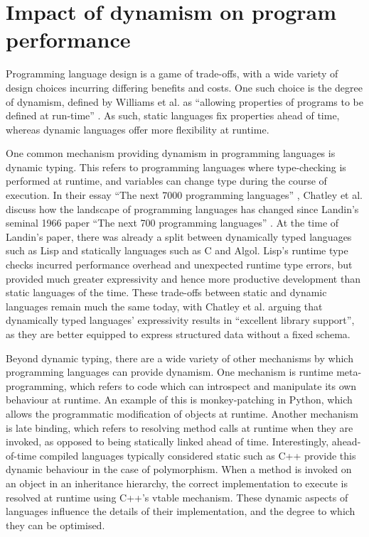 \section{Impact of dynamism on program performance}
\label{sec:impact-dynamism-related-work}

Programming language design is a game of trade-offs, with a wide variety of design choices incurring differing benefits and costs.
One such choice is the degree of dynamism, defined by Williams et al. as ``allowing properties of programs to be defined at run-time'' \cite{williamsDynamicInterpretationDynamic2010}. As such, static languages fix properties ahead of time, whereas dynamic languages offer more flexibility at runtime.

One common mechanism providing dynamism in programming languages is dynamic typing. This refers to programming languages where type-checking is performed at runtime, and variables can change type during the course of execution.
In their essay ``The next 7000 programming languages'' \cite{chatleyNext7000Programming2019}, Chatley et al. discuss how the landscape of programming languages has changed since Landin's seminal 1966 paper ``The next 700 programming languages'' \cite{landinNext700Programming1966}. At the time of Landin's paper, there was already a split between dynamically typed languages such as Lisp and statically languages such as C and Algol. Lisp's runtime type checks incurred performance overhead and unexpected runtime type errors, but provided much greater expressivity and hence more productive development than static languages of the time. These trade-offs between static and dynamic languages remain much the same today, with Chatley et al. arguing that dynamically typed languages' expressivity results in ``excellent library support'', as they are better equipped to express structured data without a fixed schema.

Beyond dynamic typing, there are a wide variety of other mechanisms by which programming languages can provide dynamism.
One mechanism is runtime meta-programming, which refers to code which can introspect and manipulate its own behaviour at runtime. An example of this is monkey-patching in Python, which allows the programmatic modification of objects at runtime.
Another mechanism is late binding, which refers to resolving method calls at runtime when they are invoked, as opposed to being statically linked ahead of time. Interestingly, ahead-of-time compiled languages typically considered static such as C++ provide this dynamic behaviour in the case of polymorphism. When a method is invoked on an object in an inheritance hierarchy, the correct implementation to execute is resolved at runtime using C++'s vtable mechanism.
These dynamic aspects of languages influence the details of their implementation, and the degree to which they can be optimised.

